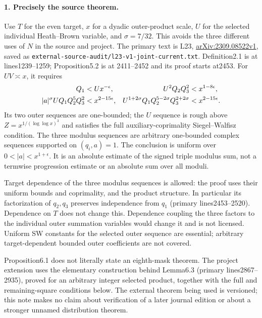 \paragraph{1. Precisely the source theorem.}
Use $T$ for the even target, $x$ for a dyadic outer-product scale,
$U$ for the selected individual Heath--Brown variable, and
$\sigma=7/32$. This avoids the three different uses of $N$ in the
source and project. The primary text is L23,
\href{https://arxiv.org/abs/2309.08522v1}{arXiv:2309.08522v1},
saved as \texttt{external-source-audit/l23-v1-joint-current.txt}.
Definition2.1 is at lines1239--1259; Proposition5.2 is at
2411--2452 and its proof starts at2453. For $UV\asymp x$, it requires
\begin{align}
 Q_1&<Ux^{-\epsilon},& U^2Q_2Q_3^2&<x^{1-8\epsilon},\notag\\
 |a|^\sigma UQ_1Q_2^5Q_3^2&<x^{2-15\epsilon},&
 U^{1+2\sigma}Q_1Q_2^{5-2\sigma}Q_3^{2+2\sigma}
   &<x^{2-15\epsilon}.                         \label{eq:current8-source-sizes}
\end{align}
Its two outer sequences are one-bounded; the $U$ sequence is rough
above $Z=x^{1/(\log\log x)^3}$ and satisfies the full
auxiliary-coprimality Siegel--Walfisz condition. The three modulus
sequences are arbitrary one-bounded complex sequences supported on
$(q_i,a)=1$. The conclusion is uniform over $0<|a|<x^{1+\epsilon}$.
It is an absolute estimate of the signed triple modulus sum, not a
termwise progression estimate or an absolute sum over all moduli.

Target dependence of the three modulus sequences is allowed: the
proof uses their uniform bounds and coprimality, and the product
structure. In particular its factorization of $q_2,q_3$ preserves
independence from $q_1$ (primary lines2453--2520). Dependence on $T$
does not change this. Dependence coupling the three factors to the
individual outer summation variables would change it and is not
licensed. Uniform SW constants for the selected outer sequence are
essential; arbitrary target-dependent bounded outer coefficients
are not covered.

Proposition6.1 does not literally state an eighth-mask theorem.
The project extension uses the elementary construction behind
Lemma6.3 (primary lines2867--2935), proved for an arbitrary integer
selected product, together with the full and remaining-square
conditions below. The external theorem being used is versioned;
this note makes no claim about verification of a later journal
edition or about a stronger unnamed distribution theorem.

